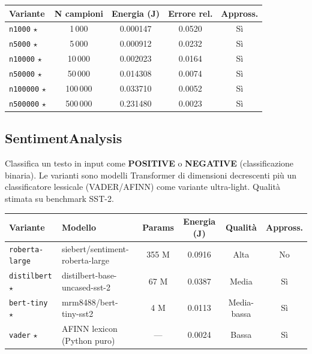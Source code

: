 \documentclass[a4paper,11pt]{article}
\begin{document}
\begin{table}[h!]
\centering
\small
\begin{tabular}{lcccc}
\toprule
\textbf{Variante} & \textbf{N campioni} & \textbf{Energia (J)} &
\textbf{Errore rel.} & \textbf{Appross.} \\
\midrule
\texttt{n1000}   $\star$ &   1\,000 & 0.000147 & 0.0520 & Sì \\
\texttt{n5000}   $\star$ &   5\,000 & 0.000912 & 0.0232 & Sì \\
\texttt{n10000}  $\star$ &  10\,000 & 0.002023 & 0.0164 & Sì \\
\texttt{n50000}  $\star$ &  50\,000 & 0.014308 & 0.0074 & Sì \\
\texttt{n100000} $\star$ & 100\,000 & 0.033710 & 0.0052 & Sì \\
\texttt{n500000} $\star$ & 500\,000 & 0.231480 & 0.0023 & Sì \\
\bottomrule
\end{tabular}
\end{table}

\subsection{SentimentAnalysis}

Classifica un testo in input come \textbf{POSITIVE} o \textbf{NEGATIVE}
(classificazione binaria). Le varianti sono modelli Transformer di dimensioni
decrescenti più un classificatore lessicale (VADER/AFINN) come variante ultra-light.
Qualità stimata su benchmark SST-2.

\begin{table}[h!]
\centering
\footnotesize
\setlength{\tabcolsep}{4pt}
\begin{tabular}{p{2.2cm}p{5.8cm}cccc}
\toprule
\textbf{Variante} & \textbf{Modello} & \textbf{Params} &
\textbf{Energia (J)} & \textbf{Qualità} & \textbf{Appross.} \\
\midrule
\texttt{roberta-large} & siebert/sentiment-roberta-large    & 355 M & 0.0916 & Alta        & No \\
\texttt{distilbert} $\star$ & distilbert-base-uncased-sst-2 &  67 M & 0.0387 & Media       & Sì \\
\texttt{bert-tiny}  $\star$ & mrm8488/bert-tiny-sst2        &   4 M & 0.0113 & Media-bassa & Sì \\
\texttt{vader}      $\star$ & AFINN lexicon (Python puro)   &  ---  & 0.0024 & Bassa       & Sì \\
\bottomrule
\end{tabular}
\end{table}
\end{document}
